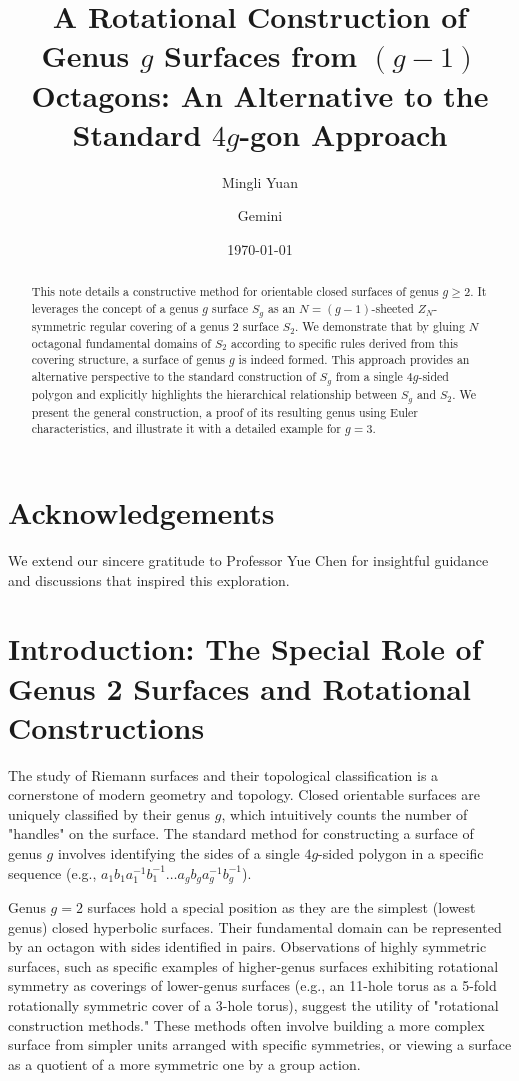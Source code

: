 \documentclass{article}
\title{A Rotational Construction of Genus $g$ Surfaces from $(g-1)$ Octagons: An Alternative to the Standard $4g$-gon Approach}
\author{Mingli Yuan \and Gemini}
\date{\today}
\theoremstyle{definition}
\theoremstyle{remark}
\begin{document}
\maketitle

\begin{abstract}
This note details a constructive method for orientable closed surfaces of genus $g \ge 2$. It leverages the concept of a genus $g$ surface $S_g$ as an $N=(g-1)$-sheeted $Z_N$-symmetric regular covering of a genus 2 surface $S_2$. We demonstrate that by gluing $N$ octagonal fundamental domains of $S_2$ according to specific rules derived from this covering structure, a surface of genus $g$ is indeed formed. This approach provides an alternative perspective to the standard construction of $S_g$ from a single $4g$-sided polygon and explicitly highlights the hierarchical relationship between $S_g$ and $S_2$. We present the general construction, a proof of its resulting genus using Euler characteristics, and illustrate it with a detailed example for $g=3$.
\end{abstract}

\section*{Acknowledgements}
We extend our sincere gratitude to Professor Yue Chen for insightful guidance and discussions that inspired this exploration.

\section{Introduction: The Special Role of Genus 2 Surfaces and Rotational Constructions}

The study of Riemann surfaces and their topological classification is a cornerstone of modern geometry and topology. Closed orientable surfaces are uniquely classified by their genus $g$, which intuitively counts the number of "handles" on the surface. The standard method for constructing a surface of genus $g$ involves identifying the sides of a single $4g$-sided polygon in a specific sequence (e.g., $a_1 b_1 a_1^{-1} b_1^{-1} \ldots a_g b_g a_g^{-1} b_g^{-1}$).

Genus $g=2$ surfaces hold a special position as they are the simplest (lowest genus) closed hyperbolic surfaces. Their fundamental domain can be represented by an octagon with sides identified in pairs. Observations of highly symmetric surfaces, such as specific examples of higher-genus surfaces exhibiting rotational symmetry as coverings of lower-genus surfaces (e.g., an 11-hole torus as a 5-fold rotationally symmetric cover of a 3-hole torus), suggest the utility of "rotational construction methods." These methods often involve building a more complex surface from simpler units arranged with specific symmetries, or viewing a surface as a quotient of a more symmetric one by a group action.
\end{document}
